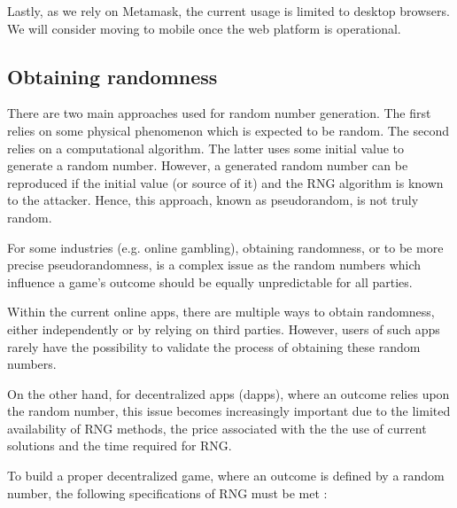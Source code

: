 \documentclass[12pt]{article}
\begin{document}
Lastly, as we rely on Metamask, the current usage is limited to desktop browsers. We will  consider moving to mobile once the web platform is operational.



\subsection{Obtaining randomness}
 \label{Obtaining randomness}  \par

There are two main approaches used for random number generation. The first relies on some physical phenomenon which is expected to be random. The second relies on a computational algorithm. The latter uses some initial value to generate a random number. However, a generated random number can be reproduced if the initial value (or source of it) and the RNG algorithm is known to the attacker. Hence, this approach, known as pseudorandom, is not truly random.\par

For some industries (e.g. online gambling), obtaining randomness, or to be more precise pseudorandomness, is a complex issue as the random numbers which influence a game’s outcome should be equally unpredictable for all parties.\par

Within the current online apps, there are multiple ways to obtain randomness, either independently or by relying on third parties. However, users of such apps rarely have the possibility to validate the process of obtaining these random numbers.\par

On the other hand, for decentralized apps (dapps), where an outcome relies upon the random number, this issue becomes increasingly important due to the limited availability of RNG methods, the price associated with the the use of current solutions and the time required for RNG.\par

To build a proper decentralized game, where an outcome is defined by a random number, the following specifications of RNG must be met  \cite{Tomas_Draksas_2017_Aug_28}:\par
\end{document}
